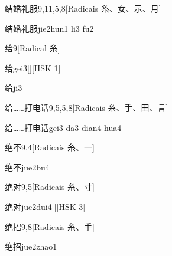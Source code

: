 \begin{entry}{结婚礼服}{9,11,5,8}[Radicais ⽷、⼥、⽰、⽉]
  \begin{phonetics}{结婚礼服}{jie2hun1 li3 fu2}
  \end{phonetics}
\end{entry}

\begin{entry}{给}{9}[Radical ⽷]
  \begin{phonetics}{给}{gei3}[][HSK 1]
  \end{phonetics}
  \begin{phonetics}{给}{ji3}
  \end{phonetics}
\end{entry}

\begin{entry}{给……打电话}{9,5,5,8}[Radicais ⽷、⼿、⽥、⾔]
  \begin{phonetics}{给……打电话}{gei3 da3 dian4 hua4}
  \end{phonetics}
\end{entry}

\begin{entry}{绝不}{9,4}[Radicais ⽷、⼀]
  \begin{phonetics}{绝不}{jue2bu4}
  \end{phonetics}
\end{entry}

\begin{entry}{绝对}{9,5}[Radicais ⽷、⼨]
  \begin{phonetics}{绝对}{jue2dui4}[][HSK 3]
  \end{phonetics}
\end{entry}

\begin{entry}{绝招}{9,8}[Radicais ⽷、⼿]
  \begin{phonetics}{绝招}{jue2zhao1}
  \end{phonetics}
\end{entry}

